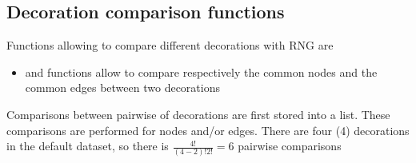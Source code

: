 \documentclass[article]{jss}\usepackage{knitr}
\begin{document}
\subsection{Decoration comparison functions} \label{sec:functions_one}

Functions allowing to compare different decorations with RNG are

\begin{itemize}
\setlength\itemsep{.1em}
  \item {} and  functions allow to compare respectively the common nodes and the common edges between two decorations
\end{itemize}

Comparisons between pairwise of decorations are first stored into a list. These comparisons are performed for nodes and/or edges. There are four (4) decorations in the default dataset, so there is $\frac{4!}{(4-2)!2!}={6}$ pairwise comparisons
\end{document}
